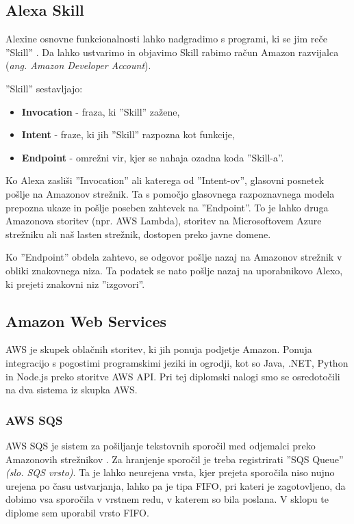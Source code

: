 \documentclass[a4paper, 12pt]{book}
\begin{document}
\subsection{Alexa Skill}

Alexine osnovne funkcionalnosti lahko nadgradimo s programi, ki se jim reče ''Skill'' \cite{alexaskills}.
Da lahko ustvarimo in objavimo Skill rabimo račun Amazon razvijalca (\textit{ang. Amazon Developer Account}).


\noindent ''Skill'' sestavljajo:
\begin{itemize}
	\item \textbf{Invocation} - fraza, ki ''Skill'' zažene,
	\item \textbf{Intent} - fraze, ki jih ''Skill'' razpozna kot funkcije,
	\item \textbf{Endpoint} - omrežni vir, kjer se nahaja ozadna koda ''Skill-a''.
\end{itemize}

Ko Alexa zasliši ''Invocation'' ali katerega od ''Intent-ov'', glasovni posnetek pošlje na Amazonov strežnik.
Ta s pomočjo glasovnega razpoznavnega modela prepozna ukaze in pošlje poseben zahtevek na ''Endpoint''.
To je lahko druga Amazonova storitev (npr. AWS Lambda), storitev na Microsoftovem Azure strežniku ali naš lasten strežnik, dostopen preko javne domene.

Ko ''Endpoint'' obdela zahtevo, se odgovor pošlje nazaj na Amazonov strežnik v obliki znakovnega niza.
Ta podatek se nato pošlje nazaj na uporabnikovo Alexo, ki prejeti znakovni niz ''izgovori''.

\subsection{Amazon Web Services}

AWS je skupek oblačnih storitev, ki jih ponuja podjetje Amazon.
Ponuja integracijo s pogostimi programskimi jeziki in ogrodji, kot so Java, .NET, Python in Node.js preko storitve AWS API.
Pri tej diplomski nalogi smo se osredotočili na dva sistema iz skupka AWS.

\subsubsection{AWS SQS}

AWS SQS je sistem za pošiljanje tekstovnih sporočil med odjemalci preko Amazonovih strežnikov \cite{sqs}.
Za hranjenje sporočil je treba registrirati ''SQS Queue'' \textit{(slo. SQS vrsto)}. 
Ta je lahko neurejena vrsta, kjer prejeta sporočila niso nujno urejena po času ustvarjanja, lahko pa je tipa FIFO, pri kateri je zagotovljeno, da dobimo vsa sporočila v vrstnem redu, v katerem so bila poslana.
V sklopu te diplome sem uporabil vrsto FIFO.
\end{document}
